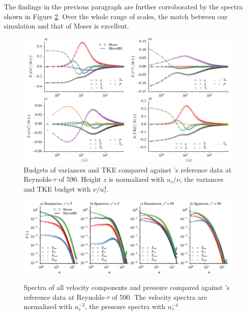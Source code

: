 \documentclass[gmd]{copernicus}
\begin{document}
The findings in the previous paragraph are further corroborated by the spectra shown in Figure \ref{fig:moser_spectra}.  Over the whole range of scales, the match between our simulation and that of Moser is excellent.

\begin{figure}[t]
\vspace*{2mm}
\begin{center}
\includegraphics[width=16.6cm]{figs/gmd_m590_turb_budg.pdf}
\end{center}
\caption{Budgets of variances and TKE compared against \citet{Moser1999}'s reference data at Reynolds-$\tau$ of 590. Height $z$ is normalized with $u_\tau / \nu$, the variances and TKE budget with $\nu / u_\tau^{4}$.}\label{fig:moser_budget}
\end{figure}

\begin{figure}[t]
\vspace*{2mm}
\begin{center}
\includegraphics[width=16.6cm]{figs/gmd_m590_spectra_4x1.pdf}\label{fig:moser_spectra}
\end{center}
\caption{Spectra of all velocity components and pressure compared against \citet{Moser1999}'s reference data at Reynolds-$\tau$ of 590. The velocity spectra are normalized with $u_\tau^{-2}$, the pressure spectra with $u_\tau^{-4}$}
\end{figure}
\end{document}
